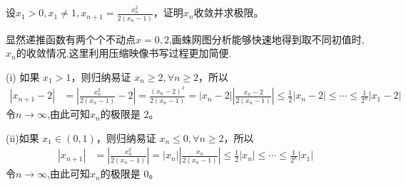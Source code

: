 \documentclass[../../main.tex]{subfiles}%
\begin{document}
\begin{example}
设\(x_1>0,x_1\neq1,x_{n + 1}=\frac{x_n^2}{2(x_n - 1)}\)，证明\(x_n\)收敛并求极限。
\end{example}
\begin{note}
显然递推函数有两个个不动点$x=0,2$,画蛛网图分析能够快速地得到取不同初值时,$x_n$的收敛情况.这里利用压缩映像书写过程更加简便.
\end{note}
\begin{solution}
(i) 如果 \(x_1 > 1\)，则归纳易证 \(x_n \geqslant  2,\forall n\geqslant  2\)，所以
\begin{align*}
|x_{n + 1} - 2|&=\left|\frac{x_n^2}{2(x_n - 1)} - 2\right|=\frac{(x_n - 2)^2}{2(x_n - 1)}=|x_n - 2|\left|\frac{x_n - 2}{2(x_n - 1)}\right|\leqslant \frac{1}{2}|x_n - 2|\leqslant \cdots\leqslant \frac{1}{2^n}|x_1 - 2|
\end{align*}
令$n\to \infty$,由此可知$x_n$的极限是 \(2\)。

(ii)如果 \(x_1\in(0,1)\)，则归纳易证 \(x_n\leqslant 0,\forall n\geqslant  2\)，所以
\begin{align*}
|x_{n + 1}|&=\left|\frac{x_n^2}{2(x_n - 1)}\right|=|x_n|\left|\frac{x_n}{2(x_n - 1)}\right|\leqslant \frac{1}{2}|x_n|\leqslant \cdots\leqslant \frac{1}{2^n}|x_1|
\end{align*}
令$n\to \infty$,由此可知$x_n$的极限是 \(0\)。

\end{solution}
\end{document}
